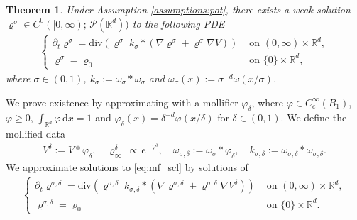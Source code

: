 \documentclass[reqno, 11pt]{amsart}
\numberwithin{equation}{section}
\newtheorem{thm}{Theorem}[section]
\theoremstyle{definition}
\begin{document}
\begin{thm}
    \label{thm:mf_scl}
    Under Assumption \ref{assumptions:pot}, there exists a weak solution $\varrho^\sigma\in C^0([0,\infty);\,\mathscr{P}(\mathbb{R}^{d}))$ to the following PDE
    \begin{align}
        \label{eq:mf_scl}
        \left\{\begin{array}{ll}
        \partial_t \varrho^\sigma
        =\mathrm{div}(\varrho^\sigma\; k_\sigma\ast (\nabla\varrho^\sigma+\varrho^\sigma\nabla V)) & \text{ on }(0,\infty)\times\mathbb{R}^{d},  \\
        \varrho^\sigma =\varrho_0 & \text{ on }\{0\}\times\mathbb{R}^{d},
    \end{array}\right.
\end{align}
where $\sigma\in (0,1)$, $k_\sigma:=\omega_\sigma\ast\omega_\sigma$ and $\omega_\sigma(x):=\sigma^{-d}\omega(x/\sigma)$.
\end{thm}
We prove existence by approximating with a mollifier $\varphi_\delta$, where $\varphi\in C_c^\infty(B_1)$, $\varphi\geq 0$, $\int_{\mathbb{R}^{d}}\varphi\,\mathrm{d} x=1$ and $\varphi_\delta(x)=\delta^{-d}\varphi(x/\delta)$ for $\delta\in (0,1)$. We define the mollified data
\begin{align*}
    V^\delta:=V\ast \varphi_\delta,\quad
    \varrho_\infty^\delta\,\propto\, e^{-V^\delta},\quad
    \omega_{\sigma,\delta}
    :=\omega_\sigma\ast \varphi_\delta,\quad
    k_{\sigma,\delta}:=\omega_{\sigma,\delta}\ast \omega_{\sigma,\delta}.
\end{align*}
We approximate solutions to \eqref{eq:mf_scl} by solutions of
\begin{align}
    \label{eq:mf_scl_delta}
    \left\{\begin{array}{ll}
    \partial_t \varrho^{\sigma,\delta}
    =\mathrm{div}(\varrho^{\sigma,\delta}\; k_{\sigma,\delta}\ast (\nabla\varrho^{\sigma,\delta}+\varrho^{\sigma,\delta}\nabla V^\delta)) & \text{ on }(0,\infty)\times\mathbb{R}^{d},  \\
    \varrho^{\sigma,\delta} =\varrho_0 & \text{ on }\{0\}\times\mathbb{R}^{d}.
\end{array}\right.
\end{align}
\end{document}
